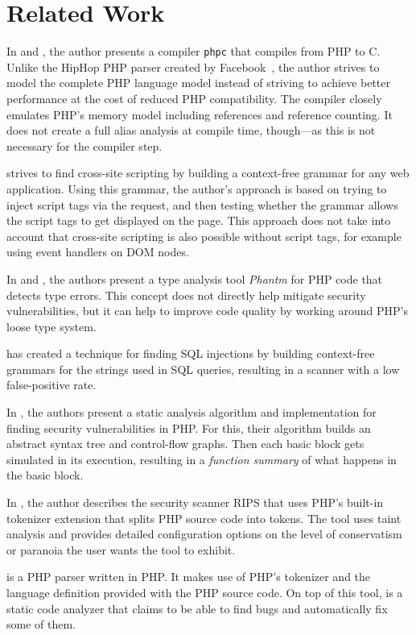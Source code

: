 \chapter{Related Work}
\label{related-work}

In \cite{phpc-thesis} and \cite{phpc-paper}, the author presents a compiler \texttt{phpc} that compiles from PHP to C. Unlike the HipHop PHP parser created by Facebook~\cite{hiphop}, the author strives to model the complete PHP language model instead of striving to achieve better performance at the cost of reduced PHP compatibility. The compiler closely emulates PHP's memory model including references and reference counting. It does not create a full alias analysis at compile time, though---as this is not necessary for the compiler step.

\cite{xss-via-grammar} strives to find cross-site scripting by building a context-free grammar for any web application. Using this grammar, the author's approach is based on trying to inject script tags via the request, and then testing whether the grammar allows the script tags to get displayed on the page. This approach does not take into account that cross-site scripting is also possible without script tags, for example using event handlers on DOM nodes.

In \cite{phantom-1} and \cite{phantom-2}, the authors present a type analysis tool \emph{Phantm} for PHP code that detects type errors. This concept does not directly help mitigate security vulnerabilities, but it can help to improve code quality by working around PHP's loose type system.

\cite{wassermann-sound} has created a technique for finding SQL injections by building context-free grammars for the strings used in SQL queries, resulting in a scanner with a low false-positive rate.

In \cite{static-php}, the authors present a static analysis algorithm and implementation for finding security vulnerabilities in PHP. For this, their algorithm builds an abstract syntax tree and control-flow graphs. Then each basic block gets simulated in its execution, resulting in a \emph{function summary} of what happens in the basic block.

In \cite{rips}, the author describes the security scanner RIPS that uses PHP's built-in tokenizer extension that splits PHP source code into tokens. The tool uses taint analysis and provides detailed configuration options on the level of conservatism or paranoia the user wants the tool to exhibit.

\cite{php-parser-popov} is a PHP parser written in PHP. It makes use of PHP's tokenizer and the language definition provided with the PHP source code. On top of this tool, \cite{php-analyzer} is a static code analyzer that claims to be able to find bugs and automatically fix some of them.

